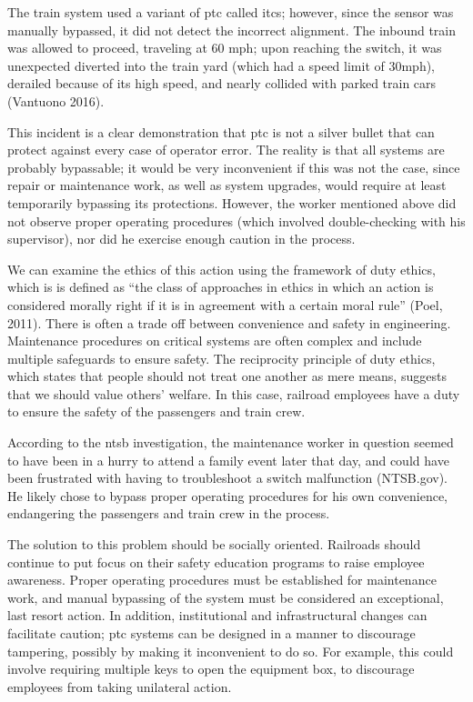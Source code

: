 \documentclass[11pt, titlepage]{article}
\begin{document}
The train system used a variant of \gls{ptc} called \gls{itcs}; however, since the
sensor was manually bypassed, it did not detect the incorrect alignment. The inbound
train was allowed to proceed, traveling at 60 mph; upon reaching the switch, it was
unexpected diverted into the train yard (which had a speed limit of 30mph), derailed
because of its high speed, and nearly collided with parked train cars (Vantuono
2016).

This incident is a clear demonstration that \gls{ptc} is not a silver bullet that
can protect against every case of operator error. The reality is that all systems
are probably bypassable; it would be very inconvenient if this was not the case,
since repair or maintenance work, as well as system upgrades, would require at least
temporarily bypassing its protections. However, the worker mentioned above did not
observe proper operating procedures (which involved double-checking with his
supervisor), nor did he exercise enough caution in the process.

We can examine the ethics of this action using the framework of duty ethics, which
is is defined as ``the class of approaches in ethics in which an action is
considered morally right if it is in agreement with a certain moral rule'' (Poel,
2011). There is often a trade off between convenience and safety in engineering.
Maintenance procedures on critical systems are often complex and include multiple
safeguards to ensure safety. The reciprocity principle of duty ethics, which states
that people should not treat one another as mere means, suggests that we should
value others’ welfare. In this case, railroad employees have a duty to ensure the
safety of the passengers and train crew.

According to the \gls{ntsb} investigation, the maintenance worker in question seemed
to have been in a hurry to attend a family event later that day, and could have been
frustrated with having to troubleshoot a switch malfunction (NTSB.gov). He likely
chose to bypass proper operating procedures for his own convenience, endangering the
passengers and train crew in the process.

The solution to this problem should be socially oriented. Railroads should continue
to put focus on their safety education programs to raise employee awareness. Proper
operating procedures must be established for maintenance work, and manual bypassing
of the system must be considered an exceptional, last resort action. In addition,
institutional and infrastructural changes can facilitate caution; \gls{ptc} systems
can be designed in a manner to discourage tampering, possibly by making it
inconvenient to do so. For example, this could involve requiring multiple keys to
open the equipment box, to discourage employees from taking unilateral action.
\end{document}
